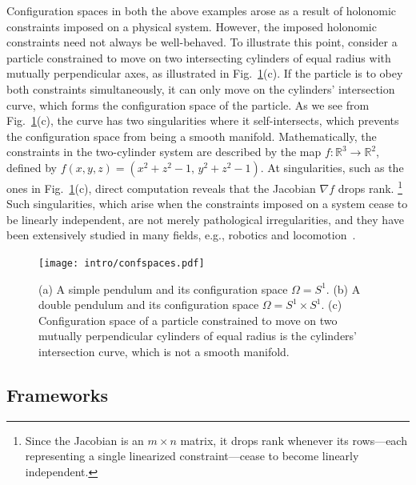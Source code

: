 Configuration spaces in both the above examples arose as a result of holonomic constraints imposed on a physical system.
However, the imposed holonomic constraints need not always be well-behaved.
To illustrate this point, consider a particle constrained to move on two intersecting cylinders of equal radius with mutually perpendicular axes, as illustrated in Fig.~\ref{fig:confspaces}(c).
If the particle is to obey both constraints simultaneously, it can only move on the cylinders' intersection curve, which forms the configuration space of the particle.
As we see from Fig.~\ref{fig:confspaces}(c), the curve has two singularities where it self-intersects, which prevents the configuration space from being a smooth manifold.
Mathematically, the constraints in the two-cylinder system are described by the map $f: \mathbb{R}^{3} \to \mathbb{R}^{2}$, defined by $f(x, y, z) = (x^{2} + z^{2} - 1,\, y^{2} + z^{2} - 1)$.
At singularities, such as the ones in Fig.~\ref{fig:confspaces}(c), direct computation reveals that the Jacobian $\nabla f$ drops rank.%
\footnote{Since the Jacobian is an $m\times n$ matrix, it drops rank whenever its rows---each representing a single linearized constraint---cease to become linearly independent.}
Such singularities, which arise when the constraints imposed on a system cease to be linearly independent, are not merely pathological irregularities, and they have been extensively studied in many fields, e.g., robotics and locomotion~\cite{muller2019}.
%
\begin{figure}
  \begin{center}
    \texttt{[image: intro/confspaces.pdf]}
  \end{center}
  \caption{
  (a) A simple pendulum and its configuration space $\Omega = S^{1}$.
  (b) A double pendulum and its configuration space $\Omega = S^{1} \times S^{1}$.
  (c) Configuration space of a particle constrained to move on two mutually perpendicular cylinders of equal radius is the cylinders' intersection curve, which is not a smooth manifold.
  }
  \label{fig:confspaces}
\end{figure}

\subsection{Frameworks}


